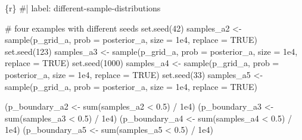 \documentclass[
  letterpaper,
  DIV=11,
  numbers=noendperiod]{scrreprt}
\newenvironment{Shaded}{\begin{snugshade}}{\end{snugshade}}
\newcommand{\AttributeTok}[1]{\textcolor[rgb]{0.40,0.45,0.13}{#1}}
\newcommand{\CommentTok}[1]{\textcolor[rgb]{0.37,0.37,0.37}{#1}}
\newcommand{\ConstantTok}[1]{\textcolor[rgb]{0.56,0.35,0.01}{#1}}
\newcommand{\DecValTok}[1]{\textcolor[rgb]{0.68,0.00,0.00}{#1}}
\newcommand{\FloatTok}[1]{\textcolor[rgb]{0.68,0.00,0.00}{#1}}
\newcommand{\FunctionTok}[1]{\textcolor[rgb]{0.28,0.35,0.67}{#1}}
\newcommand{\InformationTok}[1]{\textcolor[rgb]{0.37,0.37,0.37}{#1}}
\newcommand{\NormalTok}[1]{\textcolor[rgb]{0.00,0.23,0.31}{#1}}
\newcommand{\OtherTok}[1]{\textcolor[rgb]{0.00,0.23,0.31}{#1}}
\newcommand{\SpecialCharTok}[1]{\textcolor[rgb]{0.37,0.37,0.37}{#1}}
\begin{document}
\begin{Shaded}
\begin{Highlighting}[]
\InformationTok{\textasciigrave{}\textasciigrave{}\textasciigrave{}\{r\}}
\CommentTok{\#| label: different{-}sample{-}distributions}

\CommentTok{\# four examples with different seeds}
\FunctionTok{set.seed}\NormalTok{(}\DecValTok{42}\NormalTok{)}
\NormalTok{samples\_a2 }\OtherTok{\textless{}{-}} \FunctionTok{sample}\NormalTok{(p\_grid\_a, }\AttributeTok{prob =}\NormalTok{ posterior\_a, }\AttributeTok{size =} \FloatTok{1e4}\NormalTok{, }\AttributeTok{replace =} \ConstantTok{TRUE}\NormalTok{)}
\FunctionTok{set.seed}\NormalTok{(}\DecValTok{123}\NormalTok{)}
\NormalTok{samples\_a3 }\OtherTok{\textless{}{-}} \FunctionTok{sample}\NormalTok{(p\_grid\_a, }\AttributeTok{prob =}\NormalTok{ posterior\_a, }\AttributeTok{size =} \FloatTok{1e4}\NormalTok{, }\AttributeTok{replace =} \ConstantTok{TRUE}\NormalTok{)}
\FunctionTok{set.seed}\NormalTok{(}\DecValTok{1000}\NormalTok{)}
\NormalTok{samples\_a4 }\OtherTok{\textless{}{-}} \FunctionTok{sample}\NormalTok{(p\_grid\_a, }\AttributeTok{prob =}\NormalTok{ posterior\_a, }\AttributeTok{size =} \FloatTok{1e4}\NormalTok{, }\AttributeTok{replace =} \ConstantTok{TRUE}\NormalTok{)}
\FunctionTok{set.seed}\NormalTok{(}\DecValTok{33}\NormalTok{)}
\NormalTok{samples\_a5 }\OtherTok{\textless{}{-}} \FunctionTok{sample}\NormalTok{(p\_grid\_a, }\AttributeTok{prob =}\NormalTok{ posterior\_a, }\AttributeTok{size =} \FloatTok{1e4}\NormalTok{, }\AttributeTok{replace =} \ConstantTok{TRUE}\NormalTok{)}

\NormalTok{(p\_boundary\_a2 }\OtherTok{\textless{}{-}} \FunctionTok{sum}\NormalTok{(samples\_a2 }\SpecialCharTok{\textless{}} \FloatTok{0.5}\NormalTok{) }\SpecialCharTok{/} \FloatTok{1e4}\NormalTok{)}
\NormalTok{(p\_boundary\_a3 }\OtherTok{\textless{}{-}} \FunctionTok{sum}\NormalTok{(samples\_a3 }\SpecialCharTok{\textless{}} \FloatTok{0.5}\NormalTok{) }\SpecialCharTok{/} \FloatTok{1e4}\NormalTok{)}
\NormalTok{(p\_boundary\_a4 }\OtherTok{\textless{}{-}} \FunctionTok{sum}\NormalTok{(samples\_a4 }\SpecialCharTok{\textless{}} \FloatTok{0.5}\NormalTok{) }\SpecialCharTok{/} \FloatTok{1e4}\NormalTok{)}
\NormalTok{(p\_boundary\_a5 }\OtherTok{\textless{}{-}} \FunctionTok{sum}\NormalTok{(samples\_a5 }\SpecialCharTok{\textless{}} \FloatTok{0.5}\NormalTok{) }\SpecialCharTok{/} \FloatTok{1e4}\NormalTok{)}


\end{Highlighting}
\end{Shaded}
\end{document}
